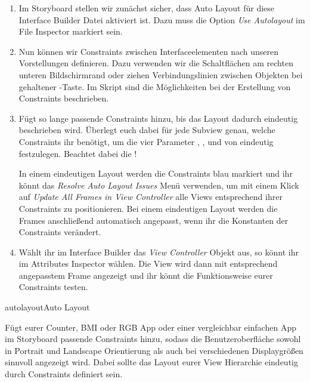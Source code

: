 \documentclass[parskip=half, final]{scrreprt}
\begin{document}
\begin{lecture}
\begin{enumerate}
\item Im Storyboard stellen wir zunächst sicher, dass Auto Layout für diese Interface Builder Datei aktiviert ist. Dazu muss die Option \emph{Use Autolayout} im File Inspector markiert sein.

\item Nun können wir Constraints zwischen Interfaceelementen nach unseren Vorstellungen definieren. Dazu verwenden wir die Schaltflächen am rechten unteren Bildschirmrand oder ziehen Verbindungslinien zwischen Objekten bei gehaltener \keys{\ctrl}-Taste. Im Skript sind die Möglichkeiten bei der Erstellung von Constraints beschrieben.

\item Fügt so lange passende Constraints hinzu, bis das Layout dadurch eindeutig beschrieben wird. Überlegt euch dabei für jede Subview genau, welche Constraints ihr benötigt, um die vier Parameter , ,  und  von  eindeutig festzulegen. Beachtet dabei die !

In einem eindeutigen Layout werden die Constraints blau markiert und ihr könnt das \emph{Resolve Auto Layout Issues} Menü verwenden, um mit einem Klick auf \emph{Update All Frames in View Controller} alle Views entsprechend ihrer Constraints zu positionieren. Bei einem eindeutigen Layout werden die Frames anschließend automatisch angepasst, wenn ihr die Konstanten der Constraints verändert.

\item Wählt ihr im Interface Builder das \emph{View Controller} Objekt aus, so könnt ihr im Attributes Inspector  wählen. Die View wird dann mit entsprechend angepasstem Frame angezeigt und ihr könnt die Funktionsweise eurer Constraints testen.

\end{enumerate}

\begin{exc}

\begin{excitem}{autolayout}{Auto Layout}

Fügt eurer Counter, BMI oder RGB App oder einer vergleichbar einfachen App im Storyboard passende Constraints hinzu, sodass die Benutzeroberfläche sowohl in Portrait und Landscape Orientierung als auch bei verschiedenen Displaygrößen sinnvoll angezeigt wird. Dabei sollte das Layout eurer View Hierarchie eindeutig durch Constraints definiert sein.


\end{excitem}
\end{exc}
\end{lecture}
\end{document}
